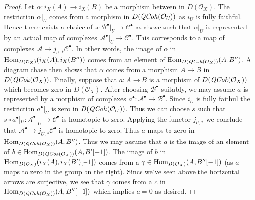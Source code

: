 \begin{proof}
\medskip\noindent
Let $\alpha : i_X(A) \to i_X(B)$ be a morphism between
in $D(\mathcal{O}_X)$. The restriction $\alpha|_U$ comes from a
morphism in $D(\mathit{QCoh}(\mathcal{O}_U))$ as $i_U$ is fully faithful.
Hence there exists a choice of
$s : \mathcal{B}^\bullet|_U \to \mathcal{C}^\bullet$ as above
such that $\alpha|_U$ is represented by an actual map of complexes
$\mathcal{A}^\bullet|_U \to \mathcal{C}^\bullet$.
This corresponds to a map of complexes
$\mathcal{A} \to j_{U, *}\mathcal{C}^\bullet$.
In other words, the image of $\alpha$ in
$\operatorname{Hom}_{D(\mathcal{O}_X)}(i_X(A), i_X(B''))$ comes from
an element of $\operatorname{Hom}_{D(\mathit{QCoh}(\mathcal{O}_X))}(A, B'')$.
A diagram chase then shows that $\alpha$ comes from a morphism
$A \to B$ in $D(\mathit{QCoh}(\mathcal{O}_X))$. Finally, suppose
that $a : A \to B$ is a morphism of $D(\mathit{QCoh}(\mathcal{O}_X))$
which becomes zero in $D(\mathcal{O}_X)$. After choosing $\mathcal{B}^\bullet$
suitably, we may assume $a$ is represented by a morphism of complexes
$a^\bullet : \mathcal{A}^\bullet \to \mathcal{B}^\bullet$.
Since $i_U$ is fully faithul the restriction $a^\bullet|_U$ is zero
in $D(\mathit{QCoh}(\mathcal{O}_U))$. Thus we can choose $s$
such that
$s \circ a^\bullet|_U : \mathcal{A}^\bullet|_U \to \mathcal{C}^\bullet$
is homotopic to zero. Applying the functor $j_{U, *}$ we conclude that
$\mathcal{A}^\bullet \to j_{U, *}\mathcal{C}^\bullet$ is homotopic
to zero. Thus $a$ maps to zero in
$\operatorname{Hom}_{D(\mathit{QCoh}(\mathcal{O}_X))}(A, B'')$.
Thus we may assume that $a$ is the image of an element
of $b \in \operatorname{Hom}_{D(\mathit{QCoh}(\mathcal{O}_X))}(A, B'[-1])$.
The image of $b$ in $\operatorname{Hom}_{D(\mathcal{O}_X)}(i_X(A), i_X(B')[-1])$
comes from a $\gamma \in \operatorname{Hom}_{D(\mathcal{O}_X)}(A, B''[-1])$
(as $a$ maps to zero in the group on the right). Since we've
seen above the horizontal arrows are surjective, we see
that $\gamma$ comes from a $c$ in
$\operatorname{Hom}_{D(\mathit{QCoh}(\mathcal{O}_X))}(A, B''[-1])$
which implies $a = 0$ as desired.


\end{proof}
